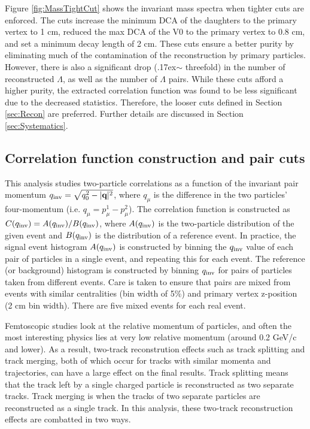 Figure \ref{fig:MassTightCut} shows the invariant mass spectra when tighter cuts are enforced.  The cuts increase the minimum DCA of the daughters to the primary vertex to 1 cm, reduced the max DCA of the V0 to the primary vertex to 0.8 cm, and set a minimum decay length of 2 cm.  These cuts ensure a better purity by eliminating much of the contamination of the reconstruction by primary particles.  However, there is also a significant drop ({\raise.17ex\hbox{$\scriptstyle\mathtt{\sim}$}} threefold) in the number of reconstructed $\Lambda$, as well as the number of $\Lambda$ pairs.  While these cuts afford a higher purity, the extracted correlation function was found to be less significant due to the decreased statistics.  Therefore, the looser cuts defined in Section \ref{sec:Recon} are preferred.  Further details are discussed in Section \ref{sec:Systematics}.

\subsection{Correlation function construction and pair cuts}
\label{sec:CFconstruct}

This analysis studies two-particle correlations as a function of the invariant pair momentum $q_{\rm inv} = \sqrt{q^2_0 - |\textbf{q}|^2}$, where $q_\mu$ is the difference in the two particles' four-momentum (i.e. $q_\mu = p^1_\mu - p^2_\mu$).  The correlation function is constructed as $C(q_{\rm inv}) = A(q_{\rm inv})/B(q_{\rm inv})$, where $A(q_{\rm inv})$ is the two-particle distribution of the given event and $B(q_{\rm inv})$ is the distribution of a reference event.  In practice, the signal event histogram $A(q_{\rm inv})$ is constructed by binning the $q_{\rm inv}$ value of each pair of particles in a single event, and repeating this for each event.  The reference (or background) histogram is constructed by binning $q_{\rm inv}$ for pairs of particles taken from different events.  Care is taken to ensure that pairs are mixed from events with similar centralities (bin width of 5\%) and primary vertex z-position (2 cm bin width).  There are five mixed events for each real event.

Femtoscopic studies look at the relative momentum of particles, and often the most interesting physics lies at very low relative momentum (around 0.2 GeV/c and lower).  As a result, two-track reconstrution effects such as track splitting and track merging, both of which occur for tracks with similar momenta and trajectories, can have a large effect on the final results.  Track splitting means that the track left by a single charged particle is reconstructed as two separate tracks. Track merging is when the tracks of two separate particles are reconstructed as a single track.  In this analysis, these two-track reconstruction effects are combatted in two ways.  

